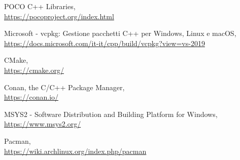 \documentclass[a4paper,12pt,oneside]{book}
\begin{document}
\begin{thebibliography}{9}
	POCO C++ Libraries,
	\\\url{https://pocoproject.org/index.html}
	
	Microsoft - vcpkg: Gestione pacchetti C++ per Windows, Linux e macOS,
	\\\url{https://docs.microsoft.com/it-it/cpp/build/vcpkg?view=vs-2019}
	
	CMake,
	\\\url{https://cmake.org/}
	
	Conan, the C/C++ Package Manager,
	\\\url{https://conan.io/}
	
	MSYS2 - Software Distribution and Building Platform for Windows,
	\\\url{https://www.msys2.org/}
	
	Pacman,
	\\\url{https://wiki.archlinux.org/index.php/pacman}
	
	
\end{thebibliography}
\end{document}
